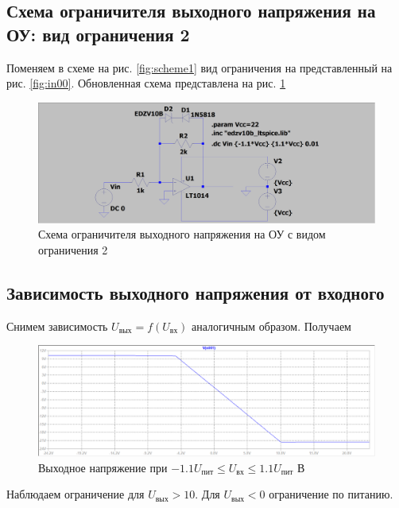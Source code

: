 \documentclass[a4paper, 12pt]{article}
\begin{document}
    \subsection{Схема ограничителя выходного напряжения на ОУ: вид ограничения 2}
    Поменяем в схеме на рис. \ref{fig:scheme1} вид ограничения на представленный на рис. \ref{fig:in00}.
    Обновленная схема представлена на рис. \ref{fig:scheme3}
    \begin{figure}[H]
        \centering
        \includegraphics[scale=0.22]{scheme3.png}
        \captionsetup{skip=0pt}
        \caption{Схема ограничителя выходного напряжения на ОУ с видом ограничения 2}
        \label{fig:scheme3}
    \end{figure}


    \subsection{Зависимость выходного напряжения от входного}
    Снимем зависимость $U_\text{вых}=f\left( U_\text{вх} \right)$ аналогичным образом.
    Получаем
    \begin{figure}[H]
        \centering
        \includegraphics[scale=0.46]{1task2_fuin.png}
        \captionsetup{skip=0pt}
        \caption{Выходное напряжение при $-1.1U_\text{пит}\leq U_\text{вх}\leq 1.1U_\text{пит}$ В}
        \label{fig:1task2_fuin}
    \end{figure}
    Наблюдаем ограничение для $U_\text{вых}>10$. Для $U_\text{вых}<0$ ограничение по питанию.
\end{document}
